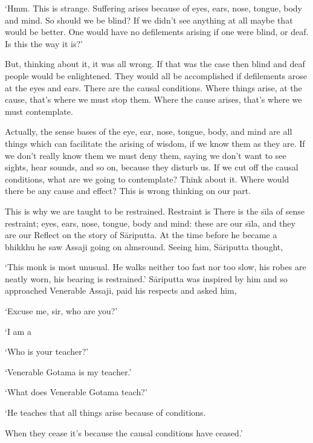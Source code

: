 `Hmm. This is strange. Suffering arises because of eyes, ears, nose, tongue, body and mind. So should we be blind? If we didn't see anything at all maybe that would be better. One would have no defilements arising if one were blind, or deaf. Is this the way it is?'

But, thinking about it, it was all wrong. If that was the case then blind and deaf people would be enlightened. They would all be accomplished if defilements arose at the eyes and ears. There are the causal conditions. Where things arise, at the cause, that's where we must stop them. Where the cause arises, that's where we must contemplate.

Actually, the sense bases of the eye, ear, nose, tongue, body, and mind are all things which can facilitate the arising of wisdom, if we know them as they are. If we don't really know them we must deny them, saying we don't want to see sights, hear sounds, and so on, because they disturb us. If we cut off the causal conditions, what are we going to contemplate? Think about it. Where would there be any cause and effect? This is wrong thinking on our part.

This is why we are taught to be restrained. Restraint is  There is the s\={\i}la of sense restraint; eyes, ears, nose, tongue, body and mind: these are our s\={\i}la, and they are our  Reflect on the story of S\=ariputta. At the time before he became a bhikkhu he saw Assaji  going on almsround. Seeing him, S\=ariputta thought,

`This monk is most unusual. He walks neither too fast nor too slow, his robes are neatly worn, his bearing is restrained.' S\=ariputta was inspired by him and so approached Venerable Assaji, paid his respects and asked him,

`Excuse me, sir, who are you?'

`I am a 

`Who is your teacher?'

`Venerable Gotama is my teacher.'

`What does Venerable Gotama teach?'

`He teaches that all things arise because of conditions.

When they cease it's because the causal conditions have ceased.'

